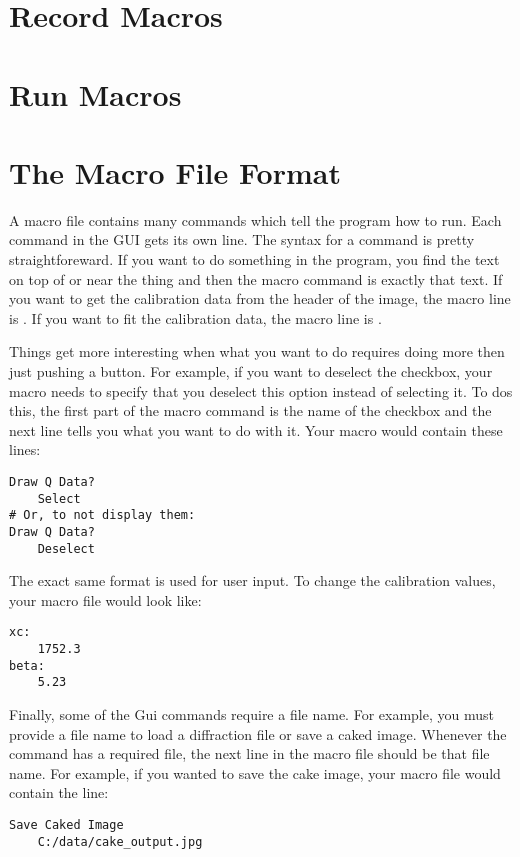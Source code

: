 \section{Record Macros}

\section{Run Macros}

\section{The Macro File Format}

A macro file contains many commands which tell the program
how to run. Each command in the GUI gets its own line. 
The syntax for a command is pretty straightforeward.
If you want to do
something in the program, you find the text on top of
or near the thing and then the macro command is exactly
that text. If you want to get the calibration data from the
header of the image, the macro line is
. If you want to fit the 
calibration data, the macro line is .

Things get more interesting when what you want to do
requires doing more then just pushing a button. For 
example, if you want to deselect the  
checkbox, your macro needs to specify that you deselect
this option instead of selecting it. To dos this, the 
first part of the macro command is the name of the
checkbox  and the next line tells
you what you want to do with it. Your macro would
contain these lines:
\begin{lstlisting}[caption={'Draw the $Q$ Lines on the Display'}]
Draw Q Data?
    Select
# Or, to not display them:
Draw Q Data?
    Deselect
\end{lstlisting}
The exact same format is used for user input. To change
the calibration values, your macro file would look like:
\begin{lstlisting}[caption={'Input a Number'}]
xc:
    1752.3
beta:
    5.23
\end{lstlisting}
Finally, some of the Gui commands require a file name.
For example, you must provide a file name to load a 
diffraction file or save a caked image. Whenever the
command has a required file, the next line in the macro 
file should be that file name. For example, if you wanted 
to save the cake image, your macro file would contain the 
line: 
\begin{lstlisting}[caption={'Save the Caked Image'}]
Save Caked Image
    C:/data/cake_output.jpg
\end{lstlisting}

